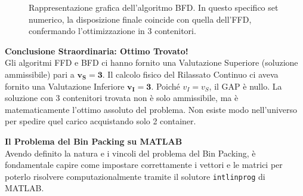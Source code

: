 \documentclass[12pt, a4paper]{article}
\begin{document}
	\begin{figure}[H]
		\centering
		\caption{Rappresentazione grafica dell'algoritmo BFD. In questo specifico set numerico, la disposizione finale coincide con quella dell'FFD, confermando l'ottimizzazione in 3 contenitori.}
	\end{figure}
	
	\vspace{0.4cm}
	\textbf{Conclusione Straordinaria: Ottimo Trovato!}\\
	Gli algoritmi FFD e BFD ci hanno fornito una Valutazione Superiore (soluzione ammissibile) pari a $\mathbf{v_S = 3}$.
	Il calcolo fisico del Rilassato Continuo ci aveva fornito una Valutazione Inferiore $\mathbf{v_I = 3}$.
	Poiché $v_I = v_S$, il GAP è nullo. La soluzione con 3 contenitori trovata non è solo ammissibile, ma è matematicamente l'ottimo assoluto del problema. Non esiste modo nell'universo per spedire quel carico acquistando solo 2 container.
	
	\vspace{0.6cm}
	\textbf{Il Problema del Bin Packing su MATLAB}\\
	Avendo definito la natura e i vincoli del problema del Bin Packing, è fondamentale capire come impostare correttamente i vettori e le matrici per poterlo risolvere computazionalmente tramite il solutore \texttt{intlinprog} di MATLAB. 
	
\end{document}
